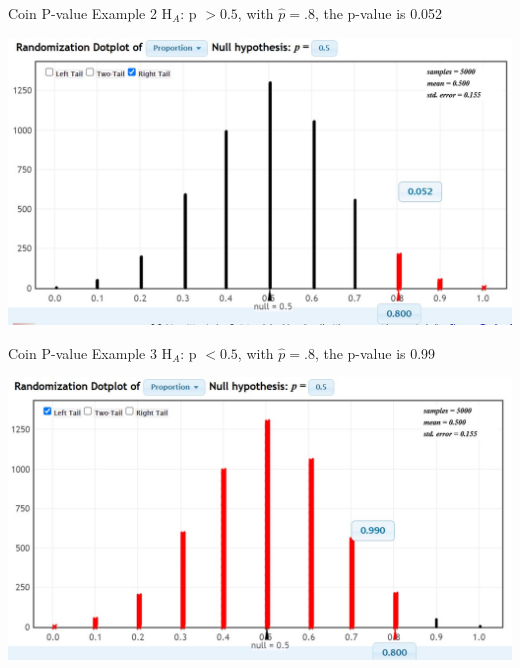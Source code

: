 \documentclass{beamer}
\begin{document}
\begin{frame}{Coin P-value Example 2}
H$_A$: p $> 0.5$, with $\widehat{p} = .8$, the p-value is 0.052
\begin{center}
    \includegraphics[scale=.55]{img/pvalue2.jpg}
\end{center}
\end{frame}

\begin{frame}{Coin P-value Example 3}
H$_A$: p $< 0.5$, with $\widehat{p} = .8$, the p-value is 0.99
\begin{center}
    \includegraphics[scale=.55]{img/pvalue1.jpg}
\end{center}
\end{frame}
\end{document}
